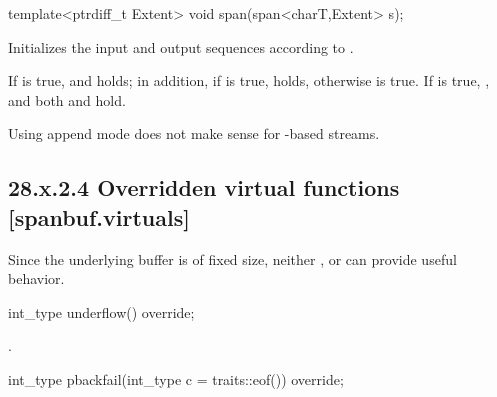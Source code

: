 \documentclass[ebook,11pt,article]{memoir}
\begin{document}
\begin{itemdecl}
template<ptrdiff_t Extent>
void span(span<charT,Extent> s);
\end{itemdecl}

\begin{itemdescr}
\pnum
\effects
{} Initializes the input and output sequences according to .

\pnum
\postconditions 
If  is true, 
 and  holds; 
in addition, 
if  is true,
 holds, 
otherwise  is true. 
If  is true, 
, and both  and  hold.

\begin{note}
Using append mode does not make sense for -based streams.
\end{note}

\end{itemdescr}

\subsection{28.x.2.4 Overridden virtual functions [spanbuf.virtuals]}
\pnum
\begin{note}
Since the underlying buffer is of fixed size, neither ,  or  can provide useful behavior.
\end{note}

\begin{itemdecl}
int_type underflow() override;
\end{itemdecl}

\begin{itemdescr}
\pnum
\returns
.
\end{itemdescr}

\begin{itemdecl}
int_type pbackfail(int_type c = traits::eof()) override;
\end{itemdecl}
\end{document}
